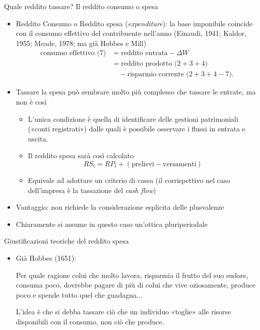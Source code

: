 \documentclass[aspectratio=64,11pt]{beamer}
\newcommand\€{\,\text{€}}
\begin{document}
\begin{frame}{Quale reddito tassare? Il reddito consumo o spesa}
\begin{itemize}
\item \alert{Reddito Consumo} o \alert{Reddito spesa} (\emph{expenditure}): la base imponibile
coincide con il consumo effettivo del contribuente nell'anno (Einaudi, 1941;
Kaldor, 1955; Meade, 1978; ma già Hobbes e Mill)
\begin{equation*}\label{eq:redconsumo}
\begin{split}
\text{consumo effettivo (7)} &=\text{reddito entrata} - \Delta W\\
&=\text{reddito prodotto ($2+3+4$)}\\
&\quad{}-\text{risparmio corrente ($2+3+4-7$)}.    
\end{split}
\end{equation*}
\item Tassare la spesa può sembrare molto più complesso che tassare le entrate, ma
non è così
\begin{itemize}
\item L'unica condizione è quella di identificare delle gestioni patrimoniali
(«conti registrati») dalle quali è possibile osservare i flussi in entrata
e uscita.
\item Il reddito spesa sarà così calcolato
\begin{equation*}
 RS_{t}=RP_{t} + (\text{prelievi} - \text{versamenti})
\end{equation*}
\item Equivale ad adottare un criterio di cassa (il corrispettivo nel caso
dell'impresa è la tassazione del \emph{cash flow})
\end{itemize}
\item Vantaggio: non richiede la considerazione esplicita delle plusvalenze
\item Chiaramente si assume in questo caso un'ottica \alert{pluriperiodale}
\end{itemize}
\end{frame}


\begin{frame}{Giustificazioni teoriche del reddito spesa}
\begin{itemize}
\item Già Hobbes (1651):
\begin{quoting}\small
   Per quale ragione colui che molto lavora, risparmia il frutto del suo 
   sudore, consuma poco, dovrebbe pagare di più di colui che vive
   oziosamente, produce poco e spende tutto quel che guadagna...
\end{quoting}
L'idea è che si debba tassare ciò che un individuo «toglie» alle risorse
disponibili con il consumo, non ciò che produce.
\end{itemize}
\end{frame}
\end{document}
